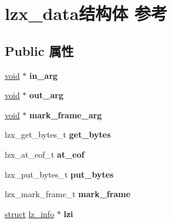 \hypertarget{structlzx__data}{}\section{lzx\+\_\+data结构体 参考}
\label{structlzx__data}
\subsection*{Public 属性}
\begin{DoxyCompactItemize}
\item 
\mbox{\label{structlzx__data_a069a6c80ec1b2d616d56d678de4ea6d9}} 
\hyperlink{interfacevoid}{void} $\ast$ {\bfseries in\+\_\+arg}
\item 
\mbox{\label{structlzx__data_a244a7130f3c6dda1e51c55848e1776ce}} 
\hyperlink{interfacevoid}{void} $\ast$ {\bfseries out\+\_\+arg}
\item 
\mbox{\label{structlzx__data_a2085af5325b069a4e0ec127f97397374}} 
\hyperlink{interfacevoid}{void} $\ast$ {\bfseries mark\+\_\+frame\+\_\+arg}
\item 
\mbox{\label{structlzx__data_aebc182c5e3136f94719233aeb661a6a5}} 
lzx\+\_\+get\+\_\+bytes\+\_\+t {\bfseries get\+\_\+bytes}
\item 
\mbox{\label{structlzx__data_a33e1fd1324edde71db522199b76cbcff}} 
lzx\+\_\+at\+\_\+eof\+\_\+t {\bfseries at\+\_\+eof}
\item 
\mbox{\label{structlzx__data_a40559e425f419841d762021652c06732}} 
lzx\+\_\+put\+\_\+bytes\+\_\+t {\bfseries put\+\_\+bytes}
\item 
\mbox{\label{structlzx__data_ac644862e726ecae308a6594e4a98477c}} 
lzx\+\_\+mark\+\_\+frame\+\_\+t {\bfseries mark\+\_\+frame}
\item 
\mbox{\label{structlzx__data_aa7ada7e5bbb78162c81c815a30f7ad0a}} 
\hyperlink{interfacestruct}{struct} \hyperlink{structlz__info}{lz\+\_\+info} $\ast$ {\bfseries lzi}
\item 
\mbox{\label{structlzx__data_a1065b43fb6e30ea18c9ad170ddf99e75}} 

\end{DoxyCompactItemize}
